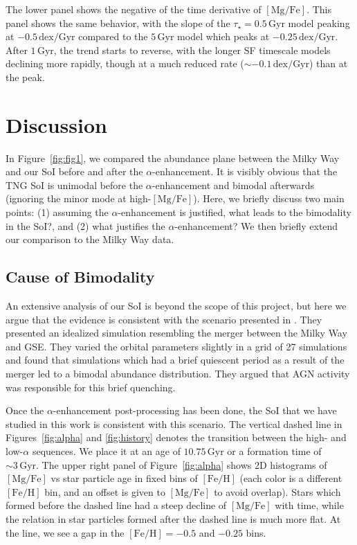 \documentclass[linenumbers, twocolumn]{aastex631}
\newcommand{\Gyr}{\ensuremath{\textrm{Gyr}}}
\newcommand{\FeH}{\ensuremath{[\textrm{Fe}/\textrm{H}]}}
\newcommand{\MgFe}{\ensuremath{[\textrm{Mg}/\textrm{Fe}]}}
\newcommand{\dex}{\ensuremath{\textrm{dex}}}
\begin{document}
The lower panel shows the negative of the time derivative of \MgFe{}. This panel shows the same behavior, with the slope of the $\tau_{\star}=0.5\,\Gyr$ model peaking at $-0.5\,\dex/\Gyr$ compared to the $5\,\Gyr$ model which peaks at $-0.25\,\dex/\Gyr$. After $1\,\Gyr$, the trend starts to reverse, with the longer SF timescale models declining more rapidly, though at a much reduced rate ($\sim-0.1\,\dex/\Gyr$) than at the peak.

\section{Discussion}\label{sec:disc}
In Figure~\ref{fig:fig1}, we compared the abundance plane between the Milky Way and our SoI before and after the $\alpha$-enhancement. It is visibly obvious that the TNG SoI is unimodal before the $\alpha$-enhancement and bimodal afterwards (ignoring the minor mode at high-\MgFe{}). Here, we briefly discuss two main points: (1) assuming the $\alpha$-enhancement is justified, what leads to the bimodality in the SoI?, and (2) what justifies the $\alpha$-enhancement? We then briefly extend our comparison to the Milky Way data.

\subsection{Cause of Bimodality}\label{ssec:bim_cause}
An extensive analysis of our SoI is beyond the scope of this project, but here we argue that the evidence is consistent with the scenario presented in \citet{2024arXiv240707985B}. They presented an idealized simulation resembling the merger between the Milky Way and GSE. They varied the orbital parameters slightly in a grid of 27 simulations and found that simulations which had a brief quiescent period as a result of the merger led to a bimodal abundance distribution. They argued that AGN activity was responsible for this brief quenching.

Once the $\alpha$-enhancement post-processing has been done, the SoI that we have studied in this work is consistent with this scenario. The vertical dashed line in Figures~\ref{fig:alpha} and \ref{fig:history} denotes the transition between the high- and low-$\alpha$ sequences. We place it at an age of $10.75\,\Gyr$ or a formation time of $\sim3\,\Gyr$. The upper right panel of Figure~\ref{fig:alpha} shows 2D histograms of \MgFe{} vs star particle age in fixed bins of \FeH{} (each color is a different \FeH{} bin, and an offset is given to \MgFe{} to avoid overlap). Stars which formed before the dashed line had a steep decline of \MgFe{} with time, while the relation in star particles formed after the dashed line is much more flat. At the line, we see a gap in the $\FeH=-0.5$ and $-0.25$ bins.
\end{document}

